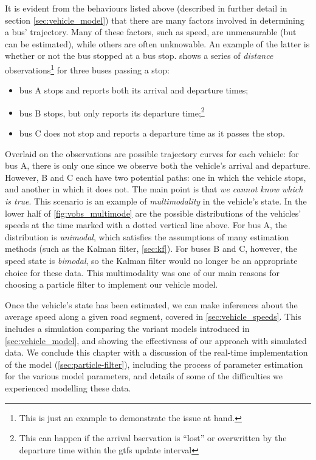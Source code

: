 It is evident from the behaviours listed above (described in further detail in section \cref{sec:vehicle_model}) that there are many factors involved in determining a bus' trajectory. Many of these factors, such as speed, are unmeasurable (but can be estimated), while others are often unknowable. An example of the latter is whether or not the bus stopped at a bus stop.  shows a series of \emph{distance} observations\footnote{This is just an example to demonstrate the issue at hand.} for three buses passing a stop:
\begin{itemize}
\item bus A stops and reports both its arrival and departure times;
\item bus B stops, but only reports its departure time;\footnote{This can happen if the arrival bservation is ``lost'' or overwritten by the departure time within the \gls{gtfs} update interval}
\item bus C does not stop and reports a departure time as it passes the stop.
\end{itemize}
Overlaid on the observations are possible trajectory curves for each vehicle: for bus A, there is only one since we observe both the vehicle's arrival and departure. However, B and C each have two potential paths: one in which the vehicle stops, and another in which it does not. The main point is that \emph{we cannot know which is true}. This scenario is an example of \emph{multimodality} in the vehicle's state. In the lower half of \cref{fig:vobs_multimode} are the possible distributions of the vehicles' speeds at the time marked with a dotted vertical line above. For bus A, the distribution is \emph{unimodal}, which satisfies the assumptions of many estimation methods (such as the Kalman filter, \cref{sec:kf}). For buses B and C, however, the speed state is \emph{bimodal}, so the Kalman filter would no longer be an appropriate choice for these data. This multimodality was one of our main reasons for choosing a particle filter to implement our vehicle model.

Once the vehicle's state has been estimated, we can make inferences about the average speed along a given road segment, covered in \cref{sec:vehicle_speeds}. This includes a simulation comparing the variant models introduced in \cref{sec:vehicle_model}, and showing the effectivness of our approach with simulated data. We conclude this chapter with a discussion of the real-time implementation of the model (\cref{sec:particle-filter}), including the process of parameter estimation for the various model parameters, and details of some of the difficulties we experienced modelling these data.










